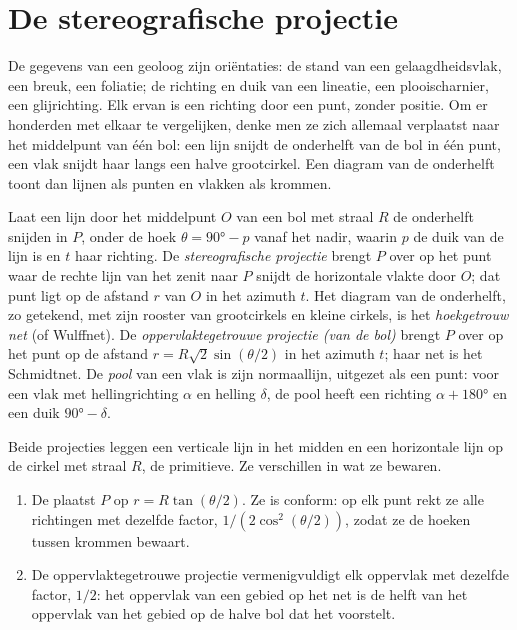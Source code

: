 \section{De stereografische projectie}\label{sec:b3:structural-analysis:stereo}

De gegevens van een geoloog zijn oriëntaties: de stand van een gelaagdheidsvlak, een
breuk, een foliatie; de richting en duik van een lineatie, een plooischarnier, een glijrichting.
Elk ervan is een richting door een punt, zonder positie. Om er honderden met elkaar te vergelijken,
denke men ze zich allemaal verplaatst naar het middelpunt van één bol:
een lijn snijdt de onderhelft van de bol in één punt, een vlak snijdt haar langs
een halve grootcirkel. Een diagram van de onderhelft toont dan lijnen als
punten en vlakken als krommen.

\begin{definition}\label{def:b3:structural-analysis:stereo}
Laat een lijn door het middelpunt $O$ van een bol met straal $R$ de onderhelft
snijden in $P$, onder de hoek $\theta = \ang{90} - p$ vanaf het nadir, waarin
$p$ de duik van de lijn is en $t$ haar richting. De \emph{stereografische
projectie} brengt $P$ over op het punt waar de rechte lijn van het zenit naar $P$
snijdt de horizontale vlakte door $O$; dat punt ligt op de afstand $r$ van $O$ in
het azimuth $t$. Het diagram van de onderhelft, zo getekend, met zijn rooster van
grootcirkels en kleine cirkels,
is het \emph{hoekgetrouw net} (of
Wulffnet). De \emph{oppervlaktegetrouwe projectie (van de bol)}
brengt $P$ over op het punt op de afstand $r =
R\sqrt2\sin(\theta/2)$ in het azimuth $t$; haar net is het Schmidtnet. De
\emph{pool} van een vlak is zijn normaallijn, uitgezet als
een punt: voor een vlak met hellingrichting $\alpha$ en helling $\delta$, de pool
heeft een richting $\alpha + \ang{180}$ en een duik $\ang{90} - \delta$.
\end{definition}

Beide projecties leggen een verticale lijn in het midden en een horizontale lijn op
de cirkel met straal $R$, de primitieve. Ze verschillen in wat ze bewaren.

\begin{theorem}\label{thm:b3:structural-analysis:projections}
\begin{enumerate}[label=(\alph*)]
  \item De  plaatst $P$ op $r = R\tan(\theta/2)$. Ze is
        conform: op elk punt rekt ze alle richtingen met dezelfde
        factor, $1/(2\cos^2(\theta/2))$, zodat ze de hoeken tussen
        krommen bewaart.
  \item De oppervlaktegetrouwe projectie vermenigvuldigt elk oppervlak met dezelfde factor,
        $1/2$: het oppervlak van een gebied op het net is de helft van het oppervlak
        van het gebied op de halve bol dat het voorstelt.
\end{enumerate}
\end{theorem}

